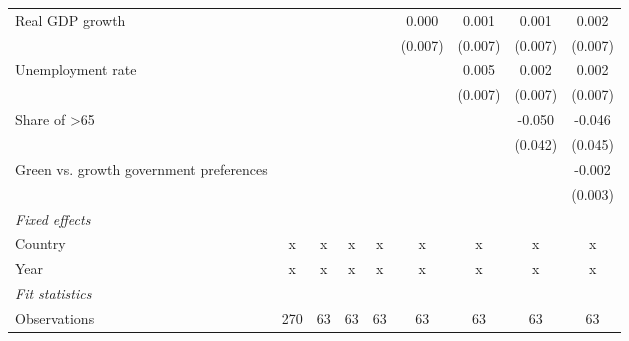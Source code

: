 \begin{table}[htbp]
\begin{tabular}{lcccccccc}
      Real GDP growth                                                                    &         &         &               &               & 0.000         & 0.001         & 0.001         & 0.002\\   
                                                                                         &         &         &               &               & (0.007)       & (0.007)       & (0.007)       & (0.007)\\   
      Unemployment rate                                                                  &         &         &               &               &               & 0.005         & 0.002         & 0.002\\   
                                                                                         &         &         &               &               &               & (0.007)       & (0.007)       & (0.007)\\   
      Share of >65                                                                       &         &         &               &               &               &               & -0.050        & -0.046\\   
                                                                                         &         &         &               &               &               &               & (0.042)       & (0.045)\\   
      Green vs. growth government preferences                                            &         &         &               &               &               &               &               & -0.002\\   
                                                                                         &         &         &               &               &               &               &               & (0.003)\\   
      \emph{Fixed effects}\\
      Country                                                                            & x       & x       & x             & x             & x             & x             & x             & x\\  
      Year                                                                               & x       & x       & x             & x             & x             & x             & x             & x\\  
      \midrule \emph{Fit statistics}\\
      Observations                                                                       & 270     & 63      & 63            & 63            & 63            & 63            & 63            & 63\\  

\end{tabular}
\end{table}
